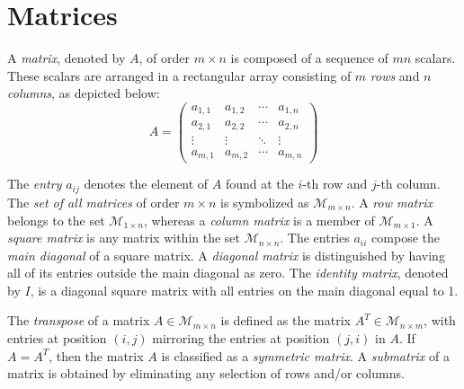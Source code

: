%
%

\section{Matrices}

A \emph{matrix}, denoted by $A$, of order $m \times n$ is composed of a sequence of $mn$ scalars. These scalars are arranged in a rectangular array consisting of $m$ \emph{rows} and $n$ \emph{columns}, as depicted below:
\[
A = 
 \begin{pmatrix}
  a_{1,1} & a_{1,2} & \cdots & a_{1,n} \\
  a_{2,1} & a_{2,2} & \cdots & a_{2,n} \\
  \vdots  & \vdots  & \ddots & \vdots  \\
  a_{m,1} & a_{m,2} & \cdots & a_{m,n} 
 \end{pmatrix}
\]

The \emph{entry} $a_{ij}$ denotes the element of $A$ found at the $i$-th row and $j$-th column. The \emph{set of all matrices} of order $m \times n$ is symbolized as $\mathcal{M}_{m \times n}$. A \emph{row matrix} belongs to the set $\mathcal{M}_{1 \times n}$, whereas a \emph{column matrix} is a member of $\mathcal{M}_{m \times 1}$. A \emph{square matrix} is any matrix within the set $\mathcal{M}_{n \times n}$. The entries $a_{ii}$ compose the \emph{main diagonal} of a square matrix. A \emph{diagonal matrix} is distinguished by having all of its entries outside the main diagonal as zero. The \emph{identity matrix}, denoted by $I$, is a diagonal square matrix with all entries on the main diagonal equal to 1.

The \emph{transpose} of a matrix $A \in \mathcal{M}_{m \times n}$ is defined as the matrix $A^T \in \mathcal{M}_{n \times m}$, with entries at position $(i,j)$ mirroring the entries at position $(j, i)$ in $A$. If $A = A^T$, then the matrix $A$ is classified as a \emph{symmetric matrix}. A \emph{submatrix} of a matrix is obtained by eliminating any selection of rows and/or columns.


